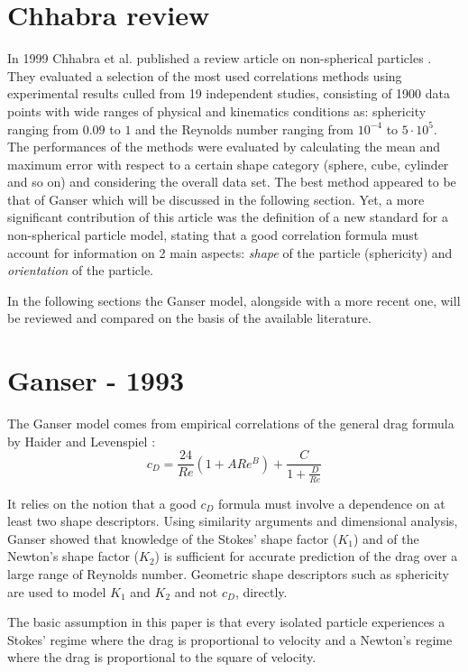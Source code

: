 	\section{Chhabra review}
		In 1999 Chhabra et al. published a review article on non-spherical particles \cite{ChhabraEtAl-1999}. They evaluated a selection of the most used correlations methods using experimental results culled from 19 independent studies, consisting of 1900 data points with wide ranges of physical and kinematics conditions as: sphericity ranging from $ 0.09 $ to $ 1 $ and the Reynolds number ranging from $ 10^{-4} $ to $  5 \cdot 10^{5} $. The performances of the methods were evaluated by calculating the mean and maximum error with respect to a certain shape category (sphere, cube, cylinder and so on) and considering the overall data set. 
		The best method appeared to be that of Ganser \cite{Ganser-1993} which will be discussed in the following section.
		Yet, a more significant contribution of this article was the definition
		of a new standard for a non-spherical particle model, stating that a good correlation formula must account for information on 2 main aspects: \textit{shape} of the particle (sphericity) and \textit{orientation} of the particle. 
		
		In the following sections the Ganser model, alongside with a more recent one, will be reviewed and compared on the basis of the available literature. 
		
	\section{Ganser - 1993}
		The Ganser model \cite{Ganser-1993} comes from empirical correlations of the general drag formula by Haider and Levenspiel \cite{HaiderLevenspiel-1989}:
		\begin{equation}
			c_D = \frac{24}{Re} (1 + A Re^B) + \dfrac{C}{1 + \frac{D}{Re}}
		\end{equation}
	
		It relies on the notion that a good $ c_D $ formula must involve a dependence on at least two shape descriptors. Using similarity arguments and dimensional analysis, Ganser showed that knowledge of the Stokes' shape factor ($ K_1 $) and of the Newton's shape factor ($ K_2 $) is sufficient for accurate prediction of the drag over a large range of Reynolds number. 
		Geometric shape descriptors such as sphericity are used	to model $ K_1 $ and $ K_2 $ and not $ c_D $, directly.
		
		The basic assumption in this paper is that every isolated particle experiences a Stokes’ regime where the drag is proportional to velocity and a Newton’s regime where the drag is proportional to the square of velocity. 
		
